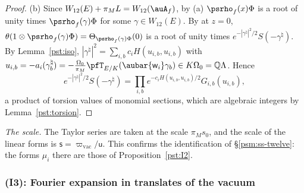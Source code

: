 \documentclass[10pt]{amsart}
\theoremstyle{definition}
\theoremstyle{remark}
\newcommand{\Q}{\mathbb Q}
\begin{document}
\begin{proof}
(b) Since $W_{12}(E)+\pi_ML=W_{12}(\auA_f)$, by (a) $\psrho_f(x)\Phi$ is a root of unity times
$\psrho_f(\gamma)\Phi$ for some $\gamma\in W_{12}(E)$. By {\cite[Lemma~5.26]{P49}} at $z=0$,
$\theta(1\otimes\psrho_f(\gamma)\Phi)=\Theta_{\psrho_f(\gamma)\Phi}(0)$ is a root of unity times
$e^{-|\gamma^\natural|^2/2}S(-\gamma^\natural)$. By Lemma~\ref{pst:iso}, $|\gamma^\natural|^2=
\sum_{i,b}c_iH(u_{i,b},u_{i,b})$ with $u_{i,b}=-a_i(\gamma^\natural_b)=-\frac{\Omega_0}{\pi_M}
\pfT_{E/K}(\aubar{\mathsf w_i}\gamma_b)\in K\Omega_0=\Q\Lambda$. Hence
\[
e^{-|\gamma^\natural|^2/2}S(-\gamma^\natural)=\prod_{i,b}e^{-c_iH(u_{i,b},u_{i,b})/2}G_{i,b}(u_{i,b}),
\]
a product of torsion values of monomial sections, which are algebraic integers by
Lemma~\ref{pst:torsion}.
\end{proof}

\emph{The scale.} The Taylor series are taken at the scale $\pi_Ms_0$, and the scale of the linear
forms is $\mathsf s=\varpi_{\mathrm{vac}}/\mathsf u$. This confirms the identification of
\S\ref{psm:ss-twelve}: the forms $\mu_i$ there are those of Proposition~\ref{pst:I2}.

\subsubsection{(I3): Fourier expansion in translates of the vacuum}\label{pst:ss-fourier}
\end{document}
